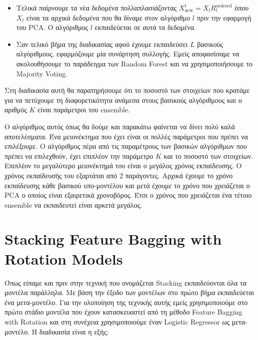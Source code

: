 \documentclass[a4paper,12pt]{report}
\theoremstyle{definitionNODot}
\begin{document}
\begin{itemize}
		\item Τελικά παίρνουμε τα νέα δεδομένα πολλαπλασιάζοντας $X^l_\text{new} = X_l R^{\text{ordered}}_l$ όπου $X_l$ είναι τα αρχικά δεδομένα που θα δίναμε στον αλγόριθμο $l$ πριν την εφαρμογή του PCA. Ο αλγόριθμος $l$ εκπαιδεύεται σε αυτά τα δεδομένα.
		\item Σαν τελικό βήμα της διαδικασίας αφού έχουμε εκπαιδεύσει $L$ βασικούς αλγόριθμους, εφαρμόζουμε μία συνάρτηση συλλογής. Εμείς αποφασίσαμε να ακολουθήσουμε το παράδειγμα των Random Forest και να χρησιμοποιήσουμε το Majority Voting.
	\end{itemize}
	Στη διαδικασία αυτή θα παρατηρήσουμε ότι το ποσοστό των στοιχείων που κρατάμε για να πετύχουμε τη διαφορετικότητα ανάμεσα στους βασικούς αλγόριθμους και ο αριθμός $K$ είναι παράμετροι του ensemble.
	
	Ο αλγόριθμος αυτός όπως θα δούμε και παρακάτω φαίνεται να δίνει πολύ καλά αποτελέσματα. Ένα μειονέκτημα που έχει είναι οι πολλές παράμετροι που πρέπει να επιλέξουμε. Ο αλγόριθμος πέρα από τις παραμέτρους των βασικών αλγόριθμων που πρέπει να επιλεχθούν, έχει επιπλέον την παράμετρο $K$ και το ποσοστό των στοιχείων. Επιπλέον το μεγαλύτερο μειονέκτημά του είναι ο μεγάλος χρόνος εκπαίδευσης. Ο χρόνος εκπαίδευσής του εξαρτάται από 2 παράγοντες. Αρχικά έχουμε το χρόνο εκπαίδευσης κάθε βασικού υπο-μοντέλου και μετά έχουμε το χρόνο που χρειάζεται ο PCA ο οποίος είναι εξαιρετικά χρονοβόρος. Έτσι ο χρόνος που χρειάζεται ένα τέτοιο ensemble να εκπαιδευτεί είναι αρκετά μεγάλος.
	
	\section{Stacking Feature Bagging with Rotation Models}
	Όπως είπαμε και πριν στην τεχνική που ονομάζεται Stacking εκπαιδεύονται όλα τα μοντέλα παράλληλα. Με βάση την έξοδο των μοντέλων στο πρώτο βήμα εκπαιδεύεται ένα μετα-μοντέλο. Για την υλοποίηση της τεχνικής αυτής εμείς χρησιμοποιούμε στο πρώτο στάδιο μοντέλα που έχουν κατασκευαστεί από τη μέθοδο Feature Bagging with Rotation και στη συνέχεια χρησιμοποιούμε έναν Logistic Regressor ως μετα-μοντέλο. Η διαδικασία είναι η εξής:
	
\end{document}

